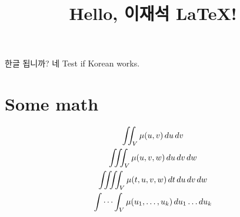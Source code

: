 \documentclass[12pt]{article}
\begin{document}
\title{Hello, 이재석 \LaTeX!}
\maketitle

한글 됩니까? 네 Test if Korean works.

\section{Some math}
\begin{gather*}
    \iint_V \mu(u,v) \,du\,dv
\\
    \iiint_V \mu(u,v,w) \,du\,dv\,dw
\\
    \iiiint_V \mu(t,u,v,w) \,dt\,du\,dv\,dw
\\
    \idotsint_V \mu(u_1,\dots,u_k) \,du_1 \dots du_k
\end{gather*}
\end{document}
